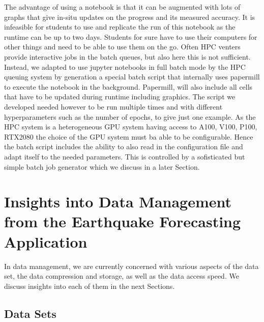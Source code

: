 \documentclass[utf8]{FrontiersinVancouver} %
\begin{document}
The advantage of using a notebook is that it can be augmented with lots
of graphs that give in-situ updates on the progress and its measured
accuracy. It is infeasible for students to use and replicate the run
of this notebook as the runtime can be up to two days. Students for
sure have to use their computers for other things and need to be able
to use them on the go. Often HPC venters provide interactive jobs in
the batch queues, but also here this is not sufficient. Instead, we
adapted to use jupyter notebooks in full batch mode by the HPC queuing
system by generation a special batch script that internally uses
papermill to execute the notebook in the background. Papermill, will
also include all cells that have to be updated during runtime
including graphics. The script we developed needed however to be run
multiple times and with different hyperparameters such as the number of
epochs, to give just one example. As the HPC system is a heterogeneous
GPU system having access to A100, V100, P100, RTX2080 the choice of
the GPU system must ba able to be configurable. Hence the batch script
includes the ability to also read in the configuration file and adapt
itself to the needed parameters. This is controlled by a sofisticated but
simple batch job generator which we discuss in a later Section.




\section{Insights into Data Management from the Earthquake Forecasting Application}
\label{sec:eq-data}

In data management, we are currently concerned with various aspects of
the data set, the data compression and storage, as well as the data
access speed. We discuss insights into each of them in the next Sections.

\subsection{Data Sets}
\end{document}
